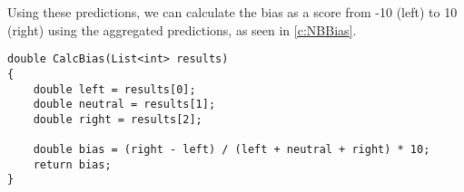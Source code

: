 Using these predictions, we can calculate the bias as a score from -10
(left) to 10 (right) using the aggregated predictions, as seen in \autoref{c:NBBias}.
\nl

\begin{minipage}[H]{\linewidth}
\begin{lstlisting}[caption = Determines the users bias based on the
predictions., label = c:NBBias]
double CalcBias(List<int> results)
{
    double left = results[0];
    double neutral = results[1];
    double right = results[2];

    double bias = (right - left) / (left + neutral + right) * 10;
    return bias;
}
\end{lstlisting}
\end{minipage}